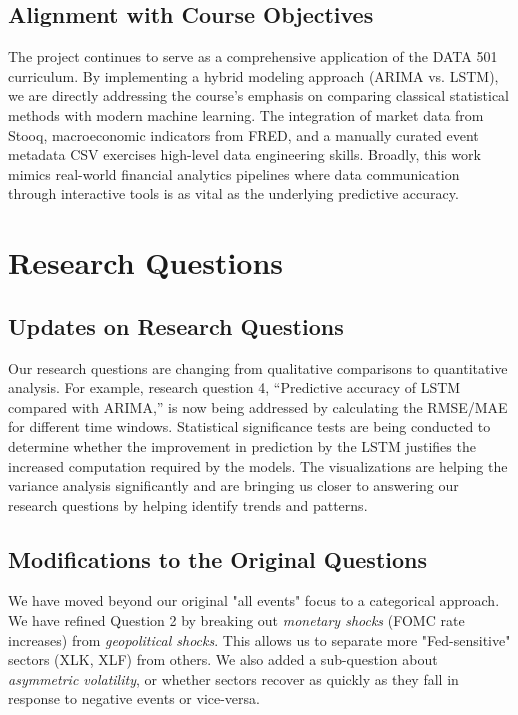 \documentclass{article}
\begin{document}
\subsection{Alignment with Course Objectives}
The project continues to serve as a comprehensive application of the DATA 501 curriculum. By implementing a hybrid modeling approach (ARIMA vs. LSTM), we are directly addressing the course's emphasis on comparing classical statistical methods with modern machine learning. The integration of market data from Stooq, macroeconomic indicators from FRED, and a manually curated event metadata CSV exercises high-level data engineering skills. Broadly, this work mimics real-world financial analytics pipelines where data communication through interactive tools is as vital as the underlying predictive accuracy.

\section{Research Questions}

\subsection{Updates on Research Questions}
Our research questions are changing from qualitative comparisons to quantitative analysis. For example, research question 4, “Predictive accuracy of LSTM compared with ARIMA,” is now being addressed by calculating the RMSE/MAE for different time windows. Statistical significance tests are being conducted to determine whether the improvement in prediction by the LSTM justifies the increased computation required by the models. The visualizations are helping the variance analysis significantly and are bringing us closer to answering our research questions by helping identify trends and patterns.

\subsection{Modifications to the Original Questions}
We have moved beyond our original "all events" focus to a categorical approach. We have refined Question 2 by breaking out \textit{monetary shocks} (FOMC rate increases) from \textit{geopolitical shocks}. This allows us to separate more "Fed-sensitive" sectors (XLK, XLF) from others. We also added a sub-question about \textit{asymmetric volatility}, or whether sectors recover as quickly as they fall in response to negative events or vice-versa.
\end{document}
